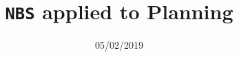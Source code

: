 \documentclass[a4paper, 10pt, oneside]{memoir}
\title				{\texttt{NBS} applied to Planning}
\date				{05/02/2019}
\begin{document}



\theoremstyle{break} %
\newtheorem{bgDef}{Definition} %

\thesisfront
\maketitle
\pagestyle{thesis}


\thesistoc
\thesismain





\thesisappendix
\thesisbib
\begin{appendices}
	
	\listoftodos
\end{appendices}
\thesisback

\end{document}
